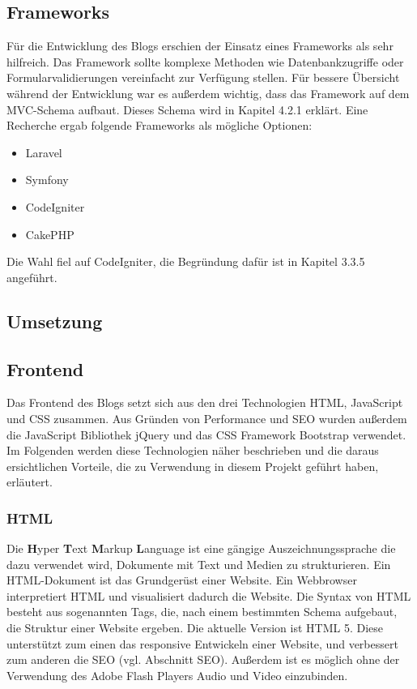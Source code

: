     \subsection*{Frameworks}
    Für die Entwicklung des Blogs erschien der Einsatz eines Frameworks als sehr hilfreich. Das Framework sollte komplexe Methoden wie
    Datenbankzugriffe oder Formularvalidierungen vereinfacht zur Verfügung stellen. Für bessere Übersicht während der Entwicklung war es außerdem
    wichtig, dass das Framework auf dem MVC-Schema aufbaut. Dieses Schema wird in Kapitel 4.2.1 erklärt. Eine Recherche ergab folgende Frameworks als mögliche
    Optionen:

    \begin{itemize}
      \item Laravel
      \item Symfony
      \item CodeIgniter
      \item CakePHP
    \end{itemize}

    Die Wahl fiel auf CodeIgniter, die Begründung dafür ist in Kapitel 3.3.5 angeführt.

  \subsection{Umsetzung}

    \subsection*{Frontend}
    Das Frontend des Blogs setzt sich aus den drei Technologien HTML, JavaScript und CSS zusammen. Aus Gründen von Performance und SEO wurden außerdem
    die JavaScript Bibliothek jQuery und das CSS Framework Bootstrap verwendet. Im Folgenden werden diese Technologien näher beschrieben und die daraus
    ersichtlichen Vorteile, die zu Verwendung in diesem Projekt geführt haben, erläutert.

      \subsubsection*{HTML}
      Die {\textbf{H}yper \textbf{T}ext \textbf{M}arkup \textbf{L}anguage\cite{html}} ist eine gängige Auszeichnungssprache die dazu verwendet wird, Dokumente mit Text und Medien zu strukturieren.
      Ein HTML-Dokument ist das Grundgerüst einer Website. Ein Webbrowser interpretiert
      HTML und visualisiert dadurch die Website. Die Syntax von HTML besteht aus sogenannten Tags, die, nach einem
      bestimmten Schema aufgebaut, die Struktur einer Website ergeben. Die aktuelle Version ist HTML 5. Diese unterstützt zum einen das responsive
      Entwickeln einer Website, und verbessert zum anderen die SEO (vgl. Abschnitt SEO). Außerdem ist es möglich ohne der Verwendung des Adobe Flash Players Audio und Video einzubinden.

